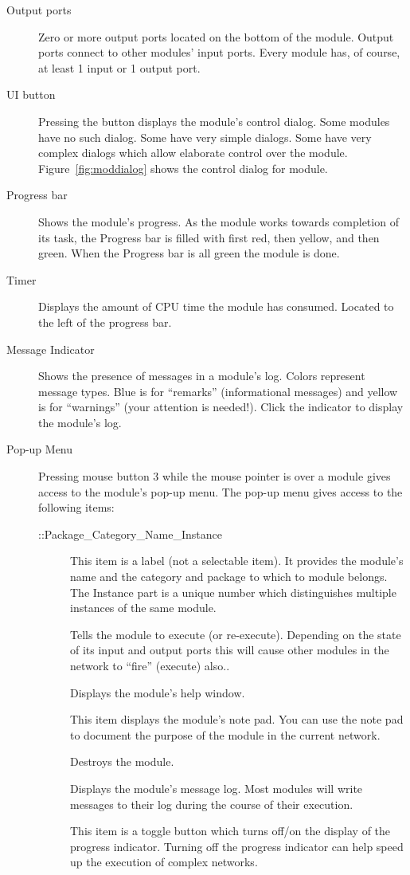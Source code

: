 \begin{description}
\item[Output ports] Zero or more output ports located on the bottom of the
  module.  Output ports connect to other modules' input ports.  Every
  module has, of course, at least 1 input or 1 output port.
\item[UI button] Pressing the  button displays the module's
  control dialog. Some modules have no such dialog. Some have very simple
  dialogs.  Some have very complex dialogs which allow elaborate control
  over the module.  Figure~\ref{fig:moddialog} shows the control dialog for
   module.
\item[Progress bar] Shows the module's progress.  As the module works
  towards completion of its task, the Progress bar is filled with
  first red, then yellow, and then green.  When the Progress bar is
  all green the module is done.
\item[Timer] Displays the amount of CPU time the module has consumed.
  Located to the left of the progress bar.
\item[Message Indicator] Shows the presence of messages in a module's
  log.  Colors represent message types.  Blue is for ``remarks''
  (informational messages) and yellow is for ``warnings'' (your
  attention is needed!).  Click the indicator to display the module's
  log.
\item[Pop-up Menu] Pressing mouse button 3 while the mouse
  pointer is over a module gives access to the module's pop-up menu.  The
  pop-up menu gives access to the following items:
  \begin{description}
  \item[::Package\_Category\_Name\_Instance] This item is a label (not a
    selectable item).  It provides the module's name and the category and
    package to which to module belongs.  The Instance part is a unique
    number which distinguishes multiple instances of the same module.
  \item[] Tells the module to execute (or re-execute).
  Depending on the state of its input and output ports this will cause
  other modules in the network to ``fire'' (execute) also..
  \item[] Displays the module's help window.
  \item[] This item displays the module's note pad.
    You can use the note pad to document the purpose of the module in
    the current network.
  \item[] Destroys the module.
  \item[] Displays the module's message log.  Most modules will
    write messages to their log during the course of their execution.
  \item[] This item is a toggle button which turns off/on the
    display of the progress indicator.  Turning off the progress indicator
    can help speed up the execution of complex networks.
  \end{description}
\end{description}


